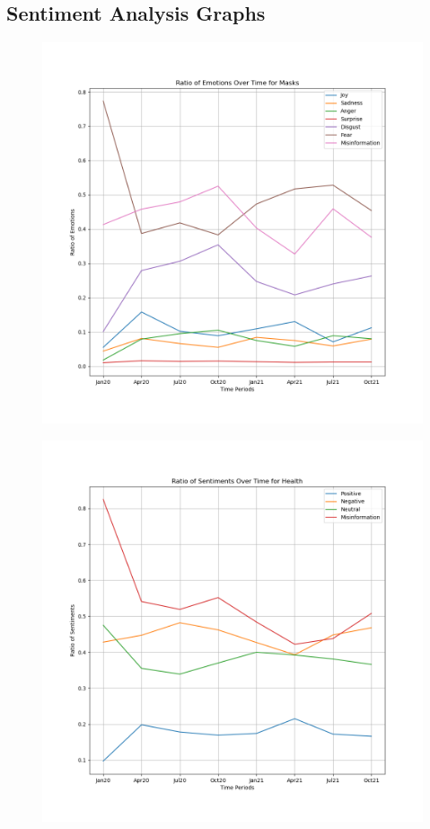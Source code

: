 \documentclass{l4proj}
\begin{document}
\begin{appendices}

\chapter{Sentiment Analysis Graphs}

\begin{figure}[H]
\begin{minipage}[c]{0.49\linewidth}
\centering
\includegraphics[width=\textwidth]{images/MasksEmotion.png}
\label{fig:maskemo}
\end{minipage}\hfill
\begin{minipage}[c]{0.49\linewidth}
\centering
\includegraphics[width=\textwidth]{images/HealthSentiment.png}

\end{minipage}
\end{figure}
\end{appendices}
\end{document}

